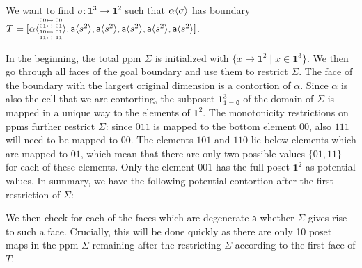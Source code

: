 \documentclass{llncs}
\makeatletter
\newcommand{\continuation}{??}
\newenvironment{examplecontd}[1]
{
  \renewcommand{\continuation}{\ref{#1}}\expcont[continued]
}
{\endexpcont}
\newcommand{\mlist}[1]{[ {#1} ]}
\newcommand{\pint}[1]{\mathbf{1}^{#1}}
\newcommand{\pintrestr}[3]{\mathbf{1}^{#1}_{{#2}={#3}}}
\newcommand{\izero}{\mathsf{0}}
\newcommand{\smap}[1]{s^{{#1}}}
\newcommand{\cont}[2]{\ensuremath{ \ifthenelse{\equal{#2}{}}{#1}{{#1}\langle{#2}\rangle}} }
\newcommand{\cset}[1]{\ensuremath{\mathsf{{#1}}}}
\newcommand{\substfour}[4]{\tiny
  \arraycolsep=.4pt\def\arraystretch{1}
  \begin{array}{ll}
    00 &\mapsto {#1} \\
    01 &\mapsto {#2} \\
    10 &\mapsto {#3} \\
    11 &\mapsto {#4} 
  \end{array}
}
\makeatother
\begin{document}
\begin{examplecontd}{exp:sndsphere}

  We want to find
  $\sigma : \pint{3} \to \pint{2}$ such that $\cont{\alpha}{\sigma}$ has boundary
$T = \mlist{ \cont{\cset{\alpha}}{\substfour{00}{01}{01}{11}} ,
  \cont{\cset{a}}{\smap{2}} , \cont{\cset{a}}{\smap{2}} ,
  \cont{\cset{a}}{\smap{2}} , \cont{\cset{a}}{\smap{2}} ,
  \cont{\cset{a}}{\smap{2}}}$.

In the beginning, the total ppm $\Sigma$ is initialized with $\{ x \mapsto
\pint{2} \mid x \in \pint{3}\}$.
We then go through all faces of the goal boundary and use them to restrict
$\Sigma$.
The face of the boundary with the largest original dimension is a contortion of
$\alpha$. Since $\alpha$ is also the cell that we are contorting, the subposet
$\pintrestr{3}{1}{\izero}$ of the domain of $\Sigma$
is mapped in a unique way to the elements of $\pint{2}$. The monotonicity
restrictions on ppms further restrict $\Sigma$: since $011$ is mapped to the
bottom element $00$, also $111$ will need to be mapped to $00$. The elements
$101$ and $110$ lie below elements which are mapped to $01$, which mean that
there are only two possible values $\{01, 11\}$ for each of these elements. Only
the element $001$ has the full poset $\pint{2}$ as potential values. In summary,
we have the following potential contortion after the first restriction of $\Sigma$:
\begin{center}
\end{center}

We then check for each of the faces which are degenerate \cset{a} whether
$\Sigma$ gives rise to such a face. Crucially, this will be done quickly as
there are only 10 poset maps in the ppm $\Sigma$ remaining after the restricting
$\Sigma$ according to the first face of $T$.

\end{examplecontd}
\end{document}
